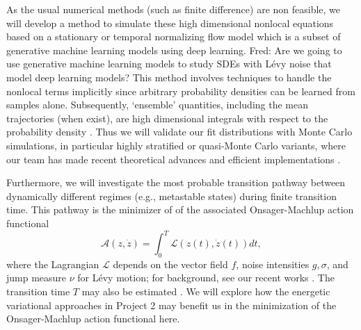 \documentclass[11pt]{NSFamsart}
\newcommand{\FredNote}[1]{{\color{blue} Fred: #1}}
\begin{document}
  
As the usual numerical methods (such as finite difference) are non feasible, we will develop a method to simulate these high dimensional nonlocal equations based on a stationary or temporal normalizing flow model which is a subset of generative machine learning models using deep learning. \FredNote{Are we going to use generative machine learning models to study SDEs with L\'evy noise that model deep learning models?} This method involves techniques to handle the nonlocal terms implicitly since arbitrary probability densities can be learned from samples alone. Subsequently, `ensemble' quantities, including the mean trajectories (when exist), are high dimensional integrals with respect to the probability density \cite{DuanBook2015}.  Thus we will validate our fit distributions with Monte Carlo simulations, in particular highly stratified or quasi-Monte Carlo variants, where our team has made recent theoretical advances \cite{Hic17a, HicEtal17a} and efficient implementations \cite{QMCPy2020a}. 

Furthermore, we will investigate the most probable transition pathway between dynamically different regimes (e.g., metastable states) during finite transition time. This pathway is the minimizer of  
of the associated Onsager-Machlup action functional 
$$
\mathcal{A}(z, \dot z) = \int_0^T \mathcal{L}(z(t), \dot z(t)) dt,
$$
where the Lagrangian  $\mathcal{L}$ depends on the vector field $f$, noise intensities $g, \sigma$, and  jump measure $\nu$ for L\'evy motion; for background, see   our recent works \cite{ChaoDuanOM,HuangYF}. The   transition time $T$ may also be estimated \cite{HuangYF2020}. We will explore how the energetic variational approaches in Project 2 may benefit us in the minimization of the Onsager-Machlup action functional here. 


 
\end{document}
